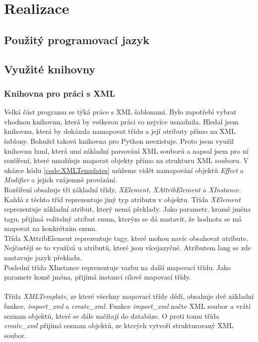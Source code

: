 \documentclass[thesis=B,czech]{resources/FITthesis}[2012/06/26]
\begin{document}
\chapter{Realizace}
\section{Použitý programovací jazyk}

\section{Využité knihovny}
\subsection{Knihovna pro práci s XML}
Velká část programu se týká práce s XML šablonami. Bylo zapotřebí vybrat vhodnou knihovnu, která by veškerou práci co nejvíce usnadnila. Hledal jsem knihovnu, která by dokázala namapovat třídu a její atributy přímo na XML šablony. Bohužel taková knihovna pro Python neexistuje. Proto jsem využil knihovnu lxml\cite{lxml}, která umí základní parsování XML souborů a napsal jsem pro ní rozšíření, které umožňuje mapovat objekty přímo na strukturu XML souboru. V ukázce kódu \ref{code:XMLTemplates} můžeme vidět namapování objektů \textit{Effect} a \textit{Modifier} a jejich vzájemné provázání. \\
Rozšíření obsahuje tři základní třídy, \textit{XElement}, \textit{XAttribElement} a \textit{XInstance}. Každá z těchto tříd reprezentuje jiný typ atributu v objektu. Třída \textit{XElement} reprezentuje základní atribut, který nemá překlady. Jako parametr, kromě jména tagu, přijímá volitelný atribut enum, kterým se dá nastavit, že hodnota se má mapovat na konkrétním enum.\\
Třída XAttribElement reprezentuje tagy, které mohou navíc obsahovat atribute. Nejčastěji se to využívá u atributů, které jsou vícejazyčné. Atributem lang se zde nastavuje jazyk překladu.\\
Poslední třída XInstance reprezentuje vazbu na další mapovací třídu. Jako parametr komě jména, přijímá instanci cílové mapovací třídy.\\
\\
Třída \textit{XMLTemplate}, ze které všechny mapovací třídy dědí, obsahuje dvě základní funkce, \textit{import\_xml} a \textit{create\_xml}. Funkce \textit{import\_xml} načte XML soubor a vrátí seznam objektů, které se dále načítají do databáze. O proti tomu třída \textit{create\_xml} přijímá seznam objektů, ze kterých vytvoří strukturovaný XML soubor.
\end{document}
